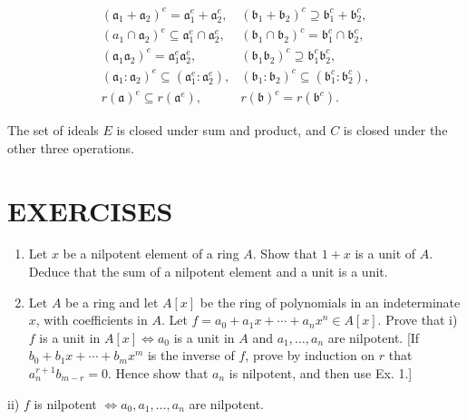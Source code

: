 \documentclass{standalone}
\theoremstyle{definition}
\theoremstyle{remark}
\begin{document}
\[
\begin{array}{ll}
\left(\mathfrak{a}_{1}+\mathfrak{a}_{2}\right)^{e}=\mathfrak{a}_{1}^{e}+\mathfrak{a}_{2}^{e}, & \left(\mathfrak{b}_{1}+\mathfrak{b}_{2}\right)^{c} \supseteq \mathfrak{b}_{1}^{c}+\mathfrak{b}_{2}^{c}, \\
\left(a_{1} \cap \mathfrak{a}_{2}\right)^{e} \subseteq \mathfrak{a}_{1}^{e} \cap \mathfrak{a}_{2}^{e}, & \left(\mathfrak{b}_{1} \cap \mathfrak{b}_{2}\right)^{c}=\mathfrak{b}_{1}^{c} \cap \mathfrak{b}_{2}^{c}, \\
\left(\mathfrak{a}_{1} \mathfrak{a}_{2}\right)^{e}=\mathfrak{a}_{1}^{e} \mathfrak{a}_{2}^{e}, & \left(\mathfrak{b}_{1} \mathfrak{b}_{2}\right)^{c} \supseteq \mathfrak{b}_{1}^{c} \mathfrak{b}_{2}^{c}, \\
\left(\mathfrak{a}_{1}: \mathfrak{a}_{2}\right)^{e} \subseteq\left(\mathfrak{a}_{1}^{e}: \mathfrak{a}_{2}^{e}\right), & \left(\mathfrak{b}_{1}: \mathfrak{b}_{2}\right)^{c} \subseteq\left(\mathfrak{b}_{1}^{c}: \mathfrak{b}_{2}^{c}\right), \\
r(\mathfrak{a})^{e} \subseteq r\left(\mathfrak{a}^{e}\right), & r(\mathfrak{b})^{c}=r\left(\mathfrak{b}^{c}\right) .
\end{array}
\]

The set of ideals $E$ is closed under sum and product, and $C$ is closed under the other three operations.

\section{EXERCISES}
\begin{enumerate}
  \item Let $x$ be a nilpotent element of a ring $A$. Show that $1+x$ is a unit of $A$. Deduce that the sum of a nilpotent element and a unit is a unit.

  \item Let $A$ be a ring and let $A[x]$ be the ring of polynomials in an indeterminate $x$, with coefficients in $A$. Let $f=a_{0}+a_{1} x+\cdots+a_{n} x^{n} \in A[x]$. Prove that i) $f$ is a unit in $A[x] \Leftrightarrow a_{0}$ is a unit in $A$ and $a_{1}, \ldots, a_{n}$ are nilpotent. [If $b_{0}+b_{1} x+\cdots+b_{m} x^{m}$ is the inverse of $f$, prove by induction on $r$ that $a_{n}^{r+1} b_{m-r}=0$. Hence show that $a_{n}$ is nilpotent, and then use Ex. 1.]

\end{enumerate}

ii) $f$ is nilpotent $\Leftrightarrow a_{0}, a_{1}, \ldots, a_{n}$ are nilpotent.
\end{document}
